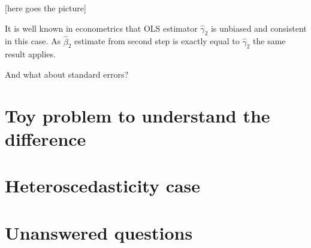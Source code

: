 \documentclass[10pt, a4paper]{article}
\begin{document}
[here goes the picture]


It is well known in econometrics that OLS estimator $\hat\gamma_2$ is unbiased and consistent in this case.
As $\hat\beta_2$ estimate from second step is exactly equal to $\hat\gamma_2$ the same result applies.

And what about standard errors?







\section{Toy problem to understand the difference}




\section{Heteroscedasticity case}


\section{Unanswered questions}
\end{document}
